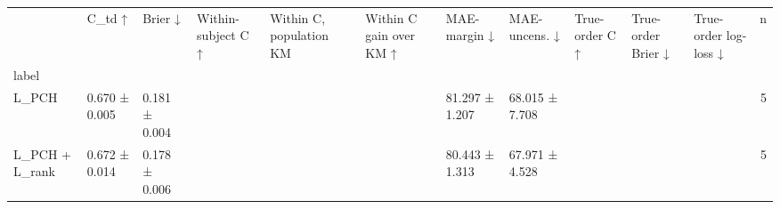 \begin{tabular}{lllllllllllr}
\toprule
 & C\_td ↑ & Brier ↓ & Within-subject C ↑ & Within C, population KM & Within C gain over KM ↑ & MAE-margin ↓ & MAE-uncens. ↓ & True-order C ↑ & True-order Brier ↓ & True-order log-loss ↓ & n \\
label &  &  &  &  &  &  &  &  &  &  &  \\
\midrule
L\_PCH & 0.670 ± 0.005 & 0.181 ± 0.004 &  &  &  & 81.297 ± 1.207 & 68.015 ± 7.708 &  &  &  & 5 \\
L\_PCH + L\_rank & 0.672 ± 0.014 & 0.178 ± 0.006 &  &  &  & 80.443 ± 1.313 & 67.971 ± 4.528 &  &  &  & 5 \\
\bottomrule
\end{tabular}
